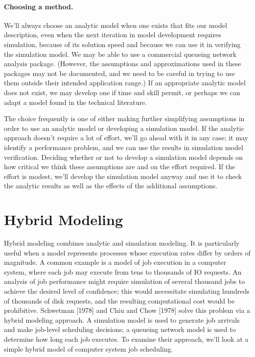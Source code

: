 \paragraph{Choosing a method.}
We'll always choose an analytic model when one exists that fits our model
description, even when the next iteration in model development requires
simulation, because of its solution speed and because we can use it in
verifying the simulation model. We may be able to use a commercial queueing
network analysis package. (However, the assumptions and approximations used
in these packages may not be documented, and we need to be careful in trying
to use them outside their intended application range.) If an appropriate
analytic model does not exist, we may develop one if time and skill permit, or
perhaps we can adapt a model found in the technical literature.

The choice frequently is one of either making further simplifying assumptions
in order to use an analytic model or developing a simulation model. If the
analytic approach doesn't require a lot of effort, we'll go ahead with it in
any case; it may identify a performance problem, and we can use the results in
simulation model verification. Deciding whether or not to develop a simulation
model depends on how critical we think these assumptions are and on the effort
required. If the effort is modest, we'll develop the simulation model anyway
and use it to check the analytic results as well as the effects of the
additional assumptions.

\section{Hybrid Modeling}
\label{sec:hybrid-modeling}

Hybrid modeling combines analytic and simulation modeling. It is particularly
useful when a model represents processes whose execution rates differ by
orders of magnitude. A common example is a model of job execution in a
computer system, where each job may execute from tens to thousands of IO
requests. An analysis of job performance might require simulation of several
thousand jobs to achieve the desired level of confidence; this would
necessitate simulating hundreds of thousands of disk requests, and the
resulting computational cost would be prohibitive. Schwetman [1978] and Chiu
and Chow [1978] solve this problem via a hybrid modeling approach. A
simulation model is used to generate job arrivals and make job-level
scheduling decisions; a queueing network model is used to determine how long
 each job executes. To examine their approach, we'll look at a simple hybrid
model of computer system job scheduling.


